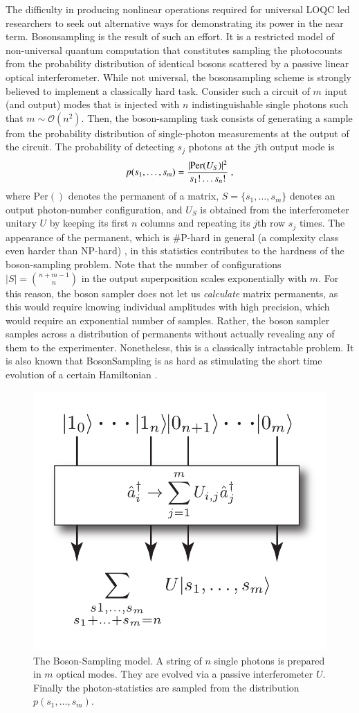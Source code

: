 \documentclass[times,final]{elsarticle}
\newcommand{\sihui}[1]{{\color{red}{#1}}}
\begin{document}
The difficulty in producing nonlinear operations required for universal LOQC led researchers to seek out alternative ways for demonstrating its power in the near term. {\sc Bosonsampling} is the result of such an effort. It is a restricted model of non-universal quantum computation \cite{bib:Aaronson11} that constitutes sampling the photocounts from the probability distribution of identical bosons scattered by a passive linear optical interferometer. While not universal, the {\sc bosonsampling} scheme is strongly believed to implement a classically hard task. Consider such a circuit of $m$ input (and output) modes that is injected with $n$ indistinguishable single photons such that $m\sim \mathcal{O}(n^2)$. Then, the boson-sampling task consists of generating a sample from the probability distribution of single-photon measurements at the output of the circuit. The probability of detecting $s_j$ photons at the $j$th output mode is
\begin{align}
p(s_1,\ldots,s_m)=\frac{|{\rm Per}(U_S)|^2}{s_1!\ldots s_n!} \ ,	
\end{align}
where $\text{Per}()$ denotes the permanent of a matrix, $S=\{s_1,\dots,s_m\}$ denotes an output photon-number configuration, and $U_S$ is obtained from the interferometer unitary $U$ by keeping its first $n$ columns and repeating its $j$th row $s_j$ times. The appearance of the permanent, which is \#P-hard in general (a complexity class even harder than NP-hard) \sihui{to compute}, in this statistics contributes to the hardness of the boson-sampling problem. Note that the number of configurations $|S|=\binom{n+m-1}{n}$ in the output superposition scales exponentially with $m$. For this reason, the boson sampler does not let us \emph{calculate} matrix permanents, as this would require knowing individual amplitudes with high precision, which would require an exponential number of samples. Rather, the boson sampler samples across a distribution of permanents without actually revealing any of them to the experimenter. Nonetheless, this is a classically intractable problem. It is also known that {\sc BosonSampling} is as hard as stimulating the short time evolution of a certain Hamiltonian \cite{bib:Peropadre17}.


\begin{figure}[!htb]
\centering
\includegraphics[width=0.3\columnwidth]{BS_model}
\caption{The Boson-Sampling model. A string of $n$ single
photons is prepared in $m$ optical modes. They are evolved
via a passive interferometer $U$. Finally the photon-statistics
are sampled from the distribution $p(s_1,\ldots,s_m)$.
} \label{fig:BosonSampling}	
\end{figure} 
\end{document}
